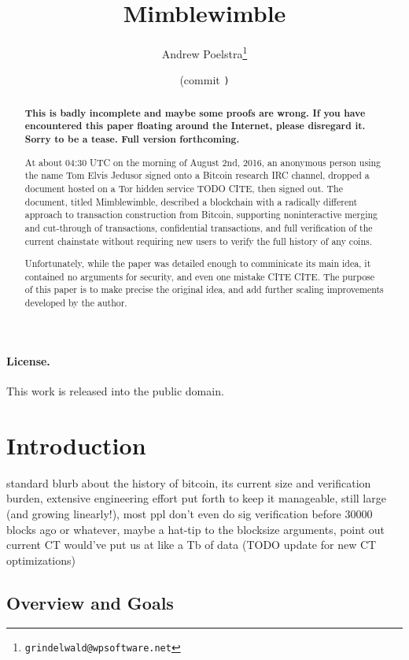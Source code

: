 \documentclass[letterpaper]{article}
\title{Mimblewimble}
\author{Andrew Poelstra\footnote{\texttt{grindelwald@wpsoftware.net}}}
\date{\gitAuthorDate{} (commit \texttt{\gitAbbrevHash)}}
\begin{document}
\maketitle

\begin{abstract} 
\textbf{This is badly incomplete and maybe some proofs are wrong. If you have
encountered this paper floating around the Internet, please disregard it.
Sorry to be a tease. Full version forthcoming.}

At about 04:30 UTC on the morning of August 2nd, 2016, an anonymous person
using the name Tom Elvis Jedusor signed onto a Bitcoin research IRC channel,
dropped a document hosted on a Tor hidden service TODO CITE, then signed out. The
document, titled Mimblewimble, described a blockchain with a radically
different approach to transaction construction from Bitcoin, supporting
noninteractive merging and cut-through of transactions, confidential
transactions, and full verification of the current chainstate without
requiring new users to verify the full history of any coins.

Unfortunately, while the paper was detailed enough to comminicate its main
idea, it contained no arguments for security, and even one mistake CITE CITE.
The purpose of this paper is to make precise the original idea, and add
further scaling improvements developed by the author.
\end{abstract}

\paragraph{License.} This work is released into the public domain.

\modulolinenumbers[10]
\linenumbers

\section{Introduction}

standard blurb about the history of bitcoin, its current size and verification
burden, extensive engineering effort put forth to keep it manageable, still
large (and growing linearly!), most ppl don't even do sig verification before
30000 blocks ago or whatever, maybe a hat-tip to the blocksize arguments,
point out current CT would've put us at like a Tb of data (TODO update for
new CT optimizations)

\subsection{Overview and Goals}
\end{document}
